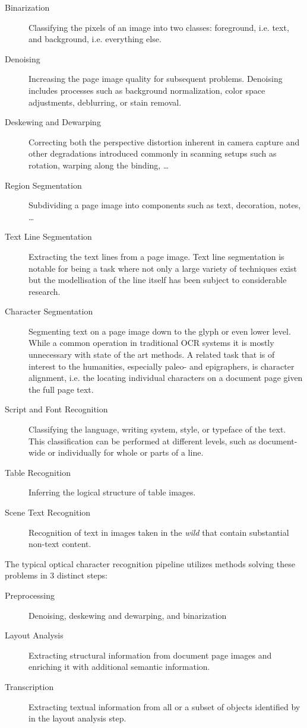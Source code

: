 \begin{description}
\item [Binarization] Classifying the pixels of an image into two classes:
foreground, i.e. text, and background, i.e. everything else.
\item [Denoising] Increasing the page image quality for subsequent problems.
Denoising includes processes such as background normalization, color space
adjustments, deblurring, or stain removal.
\item [Deskewing and Dewarping] Correcting both the perspective distortion
inherent in camera capture and other degradations introduced commonly in
scanning setups such as rotation, warping along the binding, \dots
\item [Region Segmentation] Subdividing a page image into components such as text, decoration, notes, \dots
\item [Text Line Segmentation] Extracting the text lines from a page image.
Text line segmentation is notable for being a task where not only a large
variety of techniques exist but the modellisation of the line itself has been
subject to considerable research.
\item [Character Segmentation] Segmenting text on a page image down to the
glyph or even lower level. While a common operation in traditional OCR systems
it is mostly unnecessary with state of the art methods. A related task that is
of interest to the humanities, especially paleo- and epigraphers, is character
alignment, i.e. the locating individual characters on a document page given the
full page text.
\item [Script and Font Recognition] Classifying the language, writing system,
style, or typeface of the text. This classification can be performed at
different levels, such as document-wide or individually for whole or parts of a
line.
\item [Table Recognition] Inferring the logical structure of table images.
\item [Scene Text Recognition] Recognition of text in images taken in the
\emph{wild} that contain substantial non-text content.
\end{description}

The typical optical character recognition pipeline utilizes methods solving
these problems in 3 distinct steps:

\begin{description}
\item [Preprocessing] Denoising, deskewing and dewarping, and binarization
\item [Layout Analysis] Extracting structural information from document page
images and enriching it with additional semantic information.
\item [Transcription] Extracting textual information from all or a subset of
objects identified by in the layout analysis step.
\end{description}


